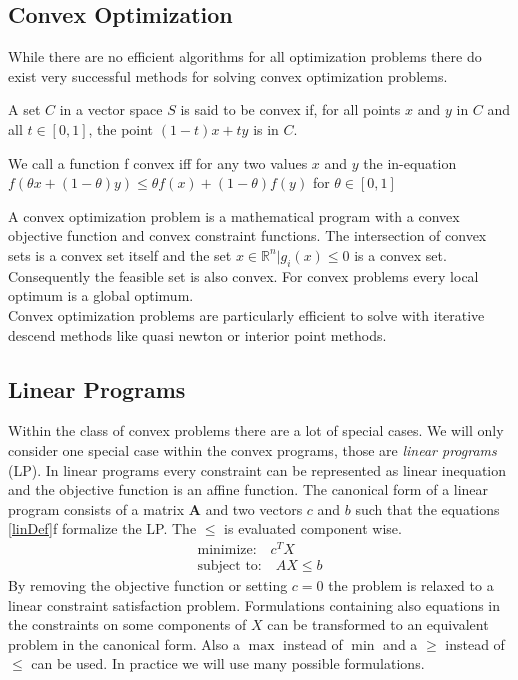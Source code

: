 \subsection{Convex Optimization}
While there are no efficient algorithms for all optimization problems there do exist very successful methods for solving convex optimization problems\cite{Boyd04ConOpt}.
\begin{definition}
A set $C$ in a vector space $S$ is said to be convex if, for all points $x$ and $y$ in $C$ and all $t\in\left[0,1\right]$, the point $(1-t)x+ty$ is in $C$.
\end{definition}
\begin{definition}
We call a function f convex iff for any two values $x$ and $y$ the in-equation $ f(\theta x + (1-\theta) y)\leq \theta f(x)+(1-\theta) f(y)$ for $\theta\in \left[0,1\right] $
\end{definition}
A convex optimization problem is a mathematical program with a convex objective function and convex constraint functions. The intersection of convex sets is a convex set itself and the set ${x\in\mathbb{R}^n|g_i(x)\leq 0}$ is a convex set. Consequently the feasible set is also convex. For convex problems every local optimum is a global optimum.\\
Convex optimization problems are particularly efficient to solve with iterative descend methods like quasi newton or interior point methods.
\subsection{Linear Programs}
\label{sec:MathLinearProgram}
Within the class of convex problems there are a lot of special cases. We will only consider one special case within the convex programs, those are \emph{linear programs} (LP).
In linear programs every constraint can be represented as linear inequation and the objective function is an affine function. 
The canonical form of a linear program consists of a matrix $\mathbf{A}$ and two vectors ${c}$ and ${b}$ such that the equations \ref{linDef}f formalize the LP. The $\leq$ is evaluated component wise.
\begin{eqnarray}
\label{linDef}
\text{minimize:}\quad {c}^TX \\
\text{subject to:}\quad AX\leq{b}
\end{eqnarray}
By removing the objective function or setting ${c}={0}$ the problem is relaxed to a linear constraint satisfaction problem. Formulations containing also equations in the constraints on some components of $X$ can be transformed to an equivalent problem in the canonical form. Also a $\max$ instead of $\min$ and a $\geq$ instead of $\leq$ can be used. In practice we will use many possible formulations.\\

